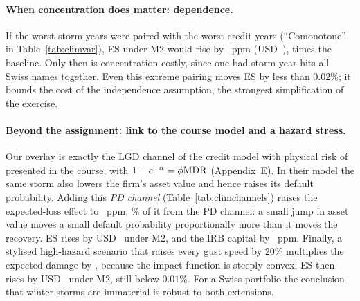 \paragraph{When concentration does matter: dependence.}
If the worst storm years were paired with the worst credit years (``Comonotone'' in Table~\ref{tab:climvar}), ES under M2 would rise by ~ppm (USD~),  times the baseline. Only then is concentration costly, since one bad storm year hits all Swiss names together. Even this extreme pairing moves ES by less than $0.02\%$; it bounds the cost of the independence assumption, the strongest simplification of the exercise.

\paragraph{Beyond the assignment: link to the course model and a hazard stress.}
\begin{table}[tb]
\caption{Storms through both credit channels (reference run, $\phi_k=0.5$, asset volatility $\sigma_A=25\%$ unless stated). $\Delta$EL exact; $\Delta$ES first-order. Lower block: all gust speeds raised by the stated percentage.}
\label{tab:climchannels}
\centering
{}
\end{table}
Our overlay is exactly the LGD channel of the credit model with physical risk of \citet{Pozdyshev25} presented in the course, with $1-e^{-\alpha}=\phi\mathrm{MDR}$ (Appendix~E). In their model the same storm also lowers the firm's asset value and hence raises its default probability. Adding this \emph{PD channel} (Table~\ref{tab:climchannels}) raises the expected-loss effect to ~ppm, \% of it from the PD channel: a small jump in asset value moves a small default probability proportionally more than it moves the recovery. ES rises by USD~ under M2, and the IRB capital by ~ppm. Finally, a stylised high-hazard scenario that raises every gust speed by $20\%$ multiplies the expected damage by , because the impact function is steeply convex; ES then rises by USD~ under M2, still below $0.01\%$. For a Swiss portfolio the conclusion that winter storms are immaterial is robust to both extensions.
